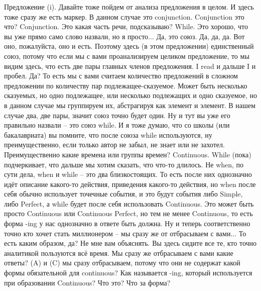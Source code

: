 \documentclass[main.tex]{subfiles}
\begin{document}
Предложение (i).
Давайте тоже пойдем от анализа предложения в целом.
И здесь тоже сразу же есть маркер.
В данном случае это conjunction.
Conjunction это что?
Conjunction.
Это какая часть речи, подсказываю?
While.
Это хорошо, что вы уже прямо само слово назвали, но я просто...
Да, это союз.
Да, да, да.
Вот оно, пожалуйста, оно и есть.
Поэтому здесь (в этом предложении) единственный союз, потому что если мы с вами проанализируем целиком предложение, то мы видим здесь, что есть две пары главных членов предложения.
I read и дальше I и пробел.
Да?
То есть мы с вами считаем количество предложений в сложном предложении по количеству пар подлежащее-сказуемое.
Может быть несколько сказуемых, но одно подлежащее, или несколько подлежащих и одно сказуемое, но в данном случае мы группируем их, абстрагируя как элемент и элемент.
В нашем случае два, две пары, значит союз точно будет один.
Ну и тут вы уже его правильно назвали -- это союз while.
И я тоже думаю, что со школы (или бакалавриата) вы помните, что после союза while используются, ну преимущественно, если только автор не забыл, не знает или не захотел.
Преимущественно какие времена или группы времен?
Continuous.
While (пока) подчеркивает, что дальше мы хотим сказать, что что-то длилось.
Не when, по сути дела, when и while -- это два близкостоящих.
То есть после них однозначно идёт описание какого-то действия, приведения какого-то действия, но when после себя обычно использует точечные события, и это будут события либо Simple, либо Perfect, а while будет после себя использовать Continuous.
Это может быть просто Continuous или Continuous Perfect, но тем не менее Continuous, то есть форма -ing у нас однозначно в ответе быть должна.
Ну и теперь соответственно точно кто хочет стать миллионером -- мы сразу же от отбрасываем с вами... 
То есть каким образом, да?
Не мне вам объяснять.
Вы здесь сидите все те, кто точно аналитикой пользуются всё время.
Мы сразу же отбрасываем с вами какие ответы?
(A) и (C) мы сразу отбрасываем, потому что они не содержат какой формы обязательной для continuous?
Как называется -ing, который используется при образовании Continuous?
Что это?
Что за форма?
\end{document}
